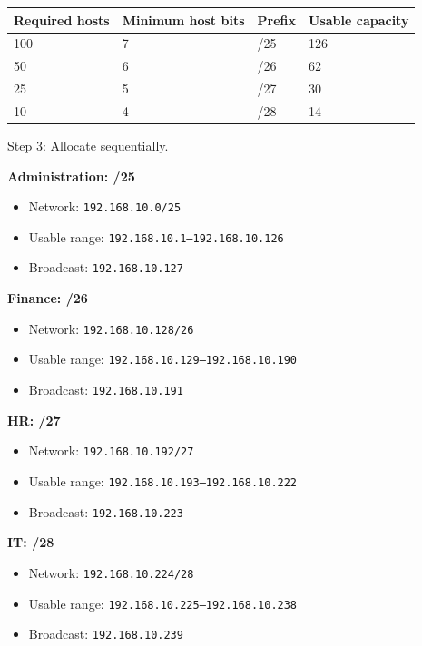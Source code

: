 \begin{center}
\begin{tabularx}{\linewidth}{p{3cm} p{3cm} p{2.5cm} X}
\toprule
\textbf{Required hosts} & \textbf{Minimum host bits} & \textbf{Prefix} & \textbf{Usable capacity} \\
\midrule
100 & 7 & /25 & 126 \\
50 & 6 & /26 & 62 \\
25 & 5 & /27 & 30 \\
10 & 4 & /28 & 14 \\
\bottomrule
\end{tabularx}
\end{center}

Step 3: Allocate sequentially.

\textbf{Administration: /25}

\begin{itemize}
\item Network: \texttt{192.168.10.0/25}
\item Usable range: \texttt{192.168.10.1--192.168.10.126}
\item Broadcast: \texttt{192.168.10.127}
\end{itemize}

\textbf{Finance: /26}

\begin{itemize}
\item Network: \texttt{192.168.10.128/26}
\item Usable range: \texttt{192.168.10.129--192.168.10.190}
\item Broadcast: \texttt{192.168.10.191}
\end{itemize}

\textbf{HR: /27}

\begin{itemize}
\item Network: \texttt{192.168.10.192/27}
\item Usable range: \texttt{192.168.10.193--192.168.10.222}
\item Broadcast: \texttt{192.168.10.223}
\end{itemize}

\textbf{IT: /28}

\begin{itemize}
\item Network: \texttt{192.168.10.224/28}
\item Usable range: \texttt{192.168.10.225--192.168.10.238}
\item Broadcast: \texttt{192.168.10.239}
\end{itemize}

